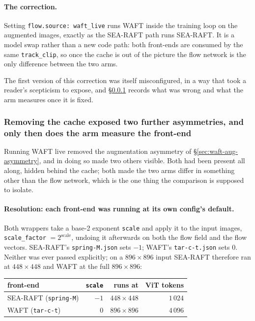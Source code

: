 \documentclass[11pt,a4paper]{article}
\begin{document}
\paragraph{The correction.} Setting \texttt{flow.source: waft\_live} runs WAFT inside the training
loop on the augmented images, exactly as the SEA-RAFT path runs SEA-RAFT. It is a model swap rather
than a new code path: both front-ends are consumed by the same \texttt{track\_clip}, so once the
cache is out of the picture the flow network is the only difference between the two arms.

The first version of this correction was itself misconfigured, in a way that took a reader's
scepticism to expose, and \S\ref{sec:waft-matched-protocol} records what was wrong and what the arm
measures once it is fixed.


\subsubsection{Removing the cache exposed two further asymmetries, and only then does the arm measure the front-end}
\label{sec:waft-matched-protocol}

Running WAFT live removed the augmentation asymmetry of \S\ref{sec:waft-aug-asymmetry}, and in doing
so made two others visible. Both had been present all along, hidden behind the cache; both made the
two arms differ in something other than the flow network, which is the one thing the comparison is
supposed to isolate.

\paragraph{Resolution: each front-end was running at its own config's default.} Both wrappers take a
base-2 exponent \texttt{scale} and apply it to the input images, \texttt{scale\_factor} $= 2^{\text{scale}}$,
undoing it afterwards on both the flow field and the flow vectors. SEA-RAFT's
\texttt{spring-M.json} sets $-1$; WAFT's \texttt{tar-c-t.json} sets $0$. Neither was ever passed
explicitly; on a $896 \times 896$ input SEA-RAFT therefore ran at $448 \times 448$ and WAFT at the
full $896 \times 896$:

\begin{center}\small
\begin{tabular}{lrrr}
\toprule
front-end & \texttt{scale} & runs at & ViT tokens \\
\midrule
SEA-RAFT (\texttt{spring-M})  & $-1$ & $448\times448$ & $1\,024$ \\
WAFT (\texttt{tar-c-t})       & $0$  & $896\times896$ & $4\,096$ \\
\bottomrule
\end{tabular}
\end{center}
\end{document}
